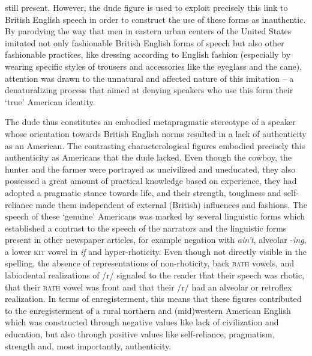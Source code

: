 still present. However, the dude figure is used to exploit precisely this link to British English speech in order to construct the use of these forms as inauthentic. By parodying the way that men in eastern urban centers of the United States imitated not only fashionable British English forms of speech but also other fashionable practices, like dressing according to English fashion (especially by wearing specific styles of trousers and accessories like the eyeglass and the cane), attention was drawn to the unnatural and affected nature of this imitation – a denaturalizing process that aimed at denying speakers who use this form their ‘true’ American identity.


The dude thus constitutes an embodied metapragmatic stereotype of a speaker whose orientation towards British English norms resulted in a lack of authenticity as an American. The contrasting characterological figures embodied precisely this authenticity as Americans that the dude lacked. Even though the cowboy, the hunter and the farmer were portrayed as uncivilized and uneducated, they also possessed a great amount of practical knowledge based on experience, they had adopted a pragmatic stance towards life, and their strength, toughness and self-reliance made them independent of external (British) influences and fashions. The speech of these ‘genuine’ Americans was marked by several linguistic forms which established a contrast to the speech of the narrators and the linguistic forms present in other newspaper articles, for example negation with \emph{ain’t}, alveolar -\emph{ing}, a lower \textsc{kit} vowel in \emph{if} and hyper-rhoticity. Even though not directly visible in the spelling, the absence of representations of non-rhoticity, back \textsc{bath} vowels, and labiodental realizations of /r/ signaled to the reader that their speech was rhotic, that their \textsc{bath} vowel was front and that their /r/ had an alveolar or retroflex realization. In terms of enregisterment, this means that these figures contributed to the enregisterment of a rural northern and (mid)western American English which was constructed through negative values like lack of civilization and education, but also through positive values like self-reliance, pragmatism, strength and, most importantly, authenticity.

